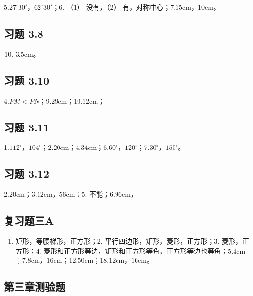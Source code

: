 5.\(27^{\circ}30'\)，\(62^{\circ}30'\)；6. （1） 没有，（2）
有，对称中心；7.\(15\mathrm{cm}\)，\(10\mathrm{cm}\)。

\subsection{习题 3.8}

\begin{enumerate}
\setcounter{enumi}{9}
\item
  3.5cm。
\end{enumerate}

\subsection{习题 3.10}

4.\(PM < PN\)；9.\(29\mathrm{cm}\)；10.\(12\mathrm{cm}\)；

\subsection{习题 3.11}

1.\(112^{\circ}\)，\(104^{\circ}\)；2.\(20\mathrm{cm}\)；4.\(34\mathrm{cm}\)；6.\(60^{\circ}\)，\(120^{\circ}\)；7.\(30^{\circ}\)，\(150^{\circ}\)。

\subsection{习题 3.12}

2.\(20\mathrm{cm}\)；3.\(12\mathrm{cm}\)，\(56\mathrm{cm}\)；5.
不能；6.\(96\mathrm{cm}\)，

\subsection{复习题三A}

\begin{enumerate}
\item
  矩形，等腰梯形，正方形；2. 平行四边形，矩形，菱形，正方形；3.
  菱形，正方形；4.
  菱形和正方形等边，矩形和正方形等角，正方形等边也等角；5.\(4\mathrm{cm}\)；7.\(8\mathrm{cm}\)，\(16\mathrm{cm}\)；12.\(50\mathrm{cm}\)；18.\(12\mathrm{cm}\)，\(16\mathrm{cm}\)。
\end{enumerate}

\subsection{第三章测验题}

